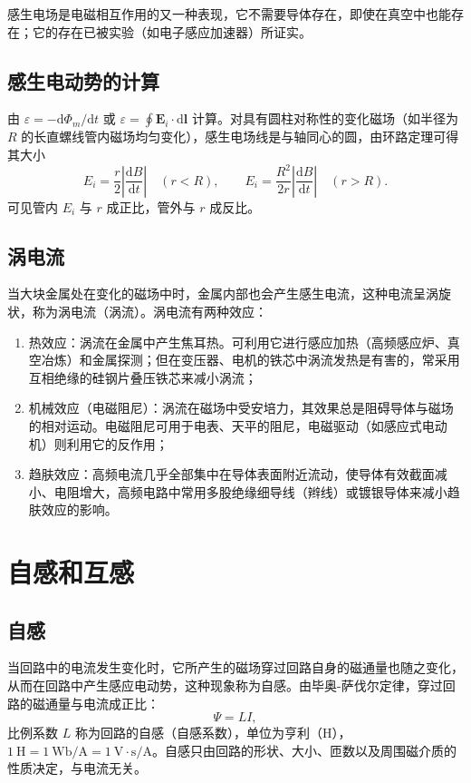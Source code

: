     感生电场是电磁相互作用的又一种表现，它不需要导体存在，即使在真空中也能存在；它的存在已被实验（如电子感应加速器）所证实。

    \subsection{感生电动势的计算}
    由 $\varepsilon=-\mathrm{d}\Phi_m/\mathrm{d}t$ 或 $\varepsilon=\oint\boldsymbol{E}_i\cdot\mathrm{d}\boldsymbol{l}$ 计算。对具有圆柱对称性的变化磁场（如半径为 $R$ 的长直螺线管内磁场均匀变化），感生电场线是与轴同心的圆，由环路定理可得其大小
    \[
    E_i=\frac{r}{2}\left|\frac{\mathrm{d}B}{\mathrm{d}t}\right|\quad(r<R),\qquad
    E_i=\frac{R^{2}}{2r}\left|\frac{\mathrm{d}B}{\mathrm{d}t}\right|\quad(r>R).
    \]
    可见管内 $E_i$ 与 $r$ 成正比，管外与 $r$ 成反比。

    \subsection{涡电流}
    当大块金属处在变化的磁场中时，金属内部也会产生感生电流，这种电流呈涡旋状，称为涡电流（涡流）。涡电流有两种效应：
    \begin{enumerate}
        \item 热效应：涡流在金属中产生焦耳热。可利用它进行感应加热（高频感应炉、真空冶炼）和金属探测；但在变压器、电机的铁芯中涡流发热是有害的，常采用互相绝缘的硅钢片叠压铁芯来减小涡流；
        \item 机械效应（电磁阻尼）：涡流在磁场中受安培力，其效果总是阻碍导体与磁场的相对运动。电磁阻尼可用于电表、天平的阻尼，电磁驱动（如感应式电动机）则利用它的反作用；
        \item 趋肤效应：高频电流几乎全部集中在导体表面附近流动，使导体有效截面减小、电阻增大，高频电路中常用多股绝缘细导线（辫线）或镀银导体来减小趋肤效应的影响。
    \end{enumerate}


\section{自感和互感}
    \subsection{自感}
    当回路中的电流发生变化时，它所产生的磁场穿过回路自身的磁通量也随之变化，从而在回路中产生感应电动势，这种现象称为自感。由毕奥-萨伐尔定律，穿过回路的磁通量与电流成正比：
    \[
    \Psi=LI,
    \]
    比例系数 $L$ 称为回路的自感（自感系数），单位为亨利（$\mathrm{H}$），$1\ \mathrm{H}=1\ \mathrm{Wb/A}=1\ \mathrm{V\cdot s/A}$。自感只由回路的形状、大小、匝数以及周围磁介质的性质决定，与电流无关。

